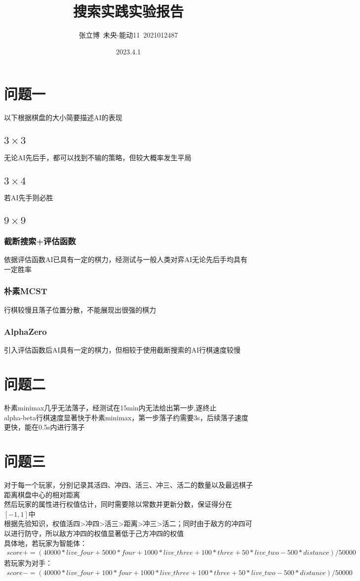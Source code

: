 \documentclass[12pt,a4paper]{article}
\title{\textbf{搜索实践实验报告}}
\author{张立博\ 未央-能动11\ 2021012487}
\date{2023.4.1}
\begin{document}
\maketitle

\section*{问题一}
以下根据棋盘的大小简要描述AI的表现
\subsection{$3\times 3$}
无论AI先后手，都可以找到不输的策略，但较大概率发生平局
\subsection{$3\times 4$}
若AI先手则必胜
\subsection{$9\times 9$}
\subsubsection*{截断搜索+评估函数}
依据评估函数AI已具有一定的棋力，经测试与一般人类对弈AI无论先后手均具有一定胜率
\subsubsection*{朴素MCST}
行棋较慢且落子位置分散，不能展现出很强的棋力
\subsubsection*{AlphaZero}
引入评估函数后AI具有一定的棋力，但相较于使用截断搜索的AI行棋速度较慢

\section*{问题二}
朴素minimax几乎无法落子，经测试在15min内无法给出第一步,遂终止\\
alpha-beta行棋速度显著快于朴素minimax，第一步落子约需要3s，后续落子速度更快，能在0.5s内进行落子
\section*{问题三}
对于每一个玩家，分别记录其活四、冲四、活三、冲三、活二的数量以及最远棋子距离棋盘中心的相对距离\\
然后玩家的属性进行权值估计，同时需要除以常数并更新分数，保证得分在$[-1,1]$中\\
根据先验知识，权值活四>冲四>活三>距离>冲三>活二；同时由于敌方的冲四可以进行防守，所以敌方冲四的权值显著低于己方冲四的权值\\
具体地，若玩家为智能体：
\begin{align*}
    score += (40000*live\_four + 5000*four + 1000*live\_three + 100 * three + 50 *live\_two - 500 * distance)/50000
\end{align*}
若玩家为对手：
\begin{align*}
    score -= (40000*live\_four + 100*four + 1000*live\_three + 100 * three + 50 *live\_two - 500 * distance)/50000
\end{align*}
\end{document}
